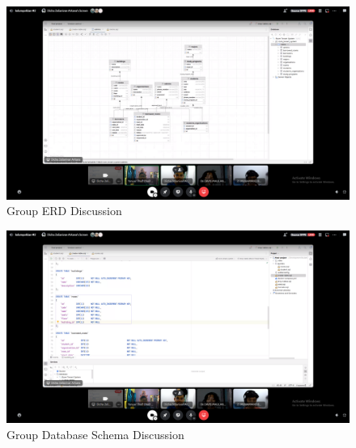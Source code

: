 \documentclass[12pt,titlepage]{article}
\begin{document}
\begin{figure}[h]
    \centering
    \includegraphics[width=.8\textwidth]{./images/documentation-1.png}
    \caption{Group ERD Discussion}
\end{figure}

\begin{figure}[h]
    \centering
    \includegraphics[width=.8\textwidth]{./images/documentation-2.png}
    \caption{Group Database Schema Discussion}
\end{figure}
\end{document}
